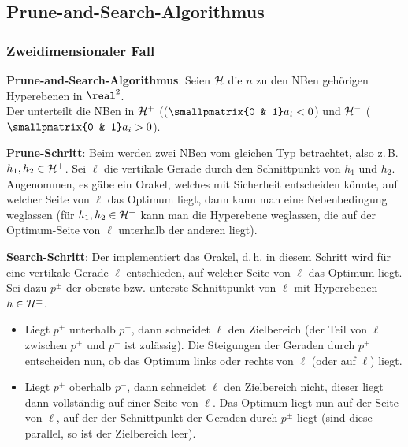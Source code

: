 \pagebreak

\subsection{%
    Prune-and-Search-Algorithmus%
}

\subsubsection{%
    Zweidimensionaler Fall%
}

\textbf{Prune-and-Search-Algorithmus}:
Seien $\mathcal{H}$ die $n$ zu den NBen gehörigen Hyperebenen in $\real^2$.\\
Der  unterteilt die NBen in
 $\mathcal{H}^+$ (($\smallpmatrix{0 & 1} a_i < 0$) und
 $\mathcal{H}^-$ ($\smallpmatrix{0 & 1} a_i > 0$).

\textbf{Prune-Schritt}:
Beim  werden zwei NBen vom gleichen Typ betrachtet,
also z.\,B. $h_1, h_2 \in \mathcal{H}^+$.
Sei $\ell$ die vertikale Gerade durch den Schnittpunkt von $h_1$ und $h_2$.
Angenommen, es gäbe ein Orakel, welches mit Sicherheit entscheiden könnte, auf welcher Seite
von $\ell$ das Optimum liegt, dann kann man eine Nebenbedingung weglassen
(für $h_1, h_2 \in \mathcal{H}^+$ kann man die Hyperebene weglassen, die auf der Optimum-Seite von $\ell$
unterhalb der anderen liegt).

\textbf{Search-Schritt}:
Der  implementiert das Orakel,
d.\,h. in diesem Schritt wird für eine vertikale Gerade $\ell$ entschieden,
auf welcher Seite von $\ell$ das Optimum liegt.\\
Sei dazu $p^\pm$ der oberste bzw. unterste Schnittpunkt von $\ell$ mit Hyperebenen $h \in \mathcal{H}^\pm$.
\begin{itemize}
    \item
    Liegt $p^+$ unterhalb $p^-$, dann schneidet $\ell$ den Zielbereich
    (der Teil von $\ell$ zwischen $p^+$ und $p^-$ ist zulässig).
    Die Steigungen der Geraden durch $p^+$ entscheiden nun, ob das Optimum links oder
    rechts von $\ell$ (oder auf $\ell$) liegt.
    
    \item
    Liegt $p^+$ oberhalb $p^-$, dann schneidet $\ell$ den Zielbereich nicht, dieser liegt dann
    vollständig auf einer Seite von $\ell$.
    Das Optimum liegt nun auf der Seite von $\ell$, auf der der Schnittpunkt der Geraden durch
    $p^\pm$ liegt
    (sind diese parallel, so ist der Zielbereich leer).
\end{itemize}

